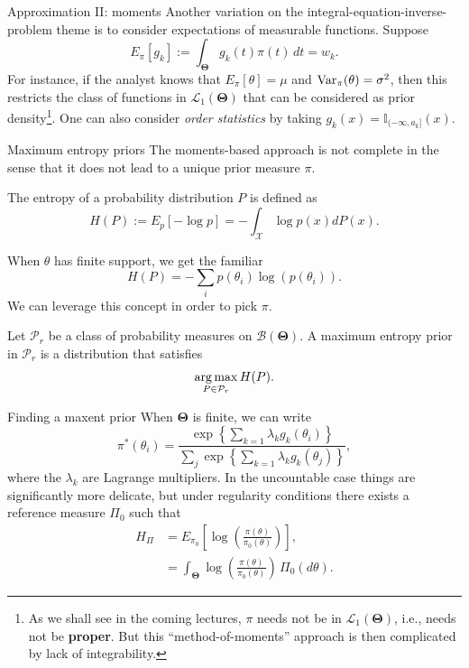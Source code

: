 \begin{frame}{Approximation II: moments}
 Another variation on the integral-equation-inverse-problem theme is to consider expectations of measurable functions.
 Suppose
 \begin{equation}
  \label{eq:prior_moments}
  E_\pi[g_k] := \int_{\boldsymbol{\Theta}} g_k(t)\pi(t)\,dt = w_k.
 \end{equation}
For instance, if the analyst knows that $E_\pi[\theta] = \mu$ and $\operatorname{Var}_\pi(\theta) = \sigma^2$, then this restricts the class of functions in $\mathcal{L}_1(\boldsymbol{\Theta})$ that can be considered as prior density\footnote{As we shall see in the coming lectures, $\pi$ needs not be in $\mathcal{L}_1(\boldsymbol{\Theta})$, i.e., needs not be \textbf{proper}. But this ``method-of-moments'' approach is then complicated by lack of integrability.}.
One can also consider \textit{order statistics} by taking $g_k(x) = \mathbb{I}_{(-\infty, a_k]}(x)$. 
\end{frame}
\begin{frame}{Maximum entropy priors} 
The moments-based approach is not complete in the sense that it does not lead to a unique prior measure $\pi$.
\begin{defn}[Entropy]
 The entropy of a probability distribution $P$ is defined as 
 \begin{equation}
  H(P) := E_p[-\log p] = -\int_
  {\mathcal{X}} \log p(x) dP(x).
 \end{equation}
\end{defn}
When $\theta$ has finite support, we get the  familiar 
$$ H(P) = - \sum_i p(\theta_i) \log(p(\theta_i)).$$
We can leverage this concept in order to pick $\pi$.
\begin{defn}
\label{def:maxent_prior}
Let $\mathcal{P}_r$ be a class of probability measures on $\mathcal{B}(\boldsymbol{\Theta})$. 
A maximum entropy prior in $\mathcal{P}_r$ is a distribution that satisfies
$$ \operatorname*{arg\,max}_{ P \in \mathcal{P}_r } H(P).$$
\end{defn}
\end{frame}
\begin{frame}{Finding a maxent prior}
When $\boldsymbol{\Theta}$ is finite, we can write
\begin{equation*}
 \pi^\ast(\theta_i) = \frac{\exp\left\{\sum_{k=1} \lambda_k g_k(\theta_i) \right\}}{\sum_j \exp\left\{\sum_{k=1} \lambda_k g_k(\theta_j) \right\}},
\end{equation*}
where the $\lambda_k$ are Lagrange multipliers.
In the uncountable case things are significantly more delicate, but under regularity conditions there exists a reference measure $\Pi_0$ such that 
\begin{align*}
 H_\Pi &= E_{\pi_0}\left[\log \left(\frac{\pi(\theta)}{\pi_0(\theta)}\right)\right],\\
 &= \int_{\boldsymbol{\Theta}} \log \left(\frac{\pi(\theta)}{\pi_0(\theta)}\right)\, \Pi_0(d\theta).
\end{align*}
\end{frame}

